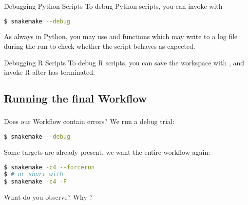 \begin{frame}[fragile]
	\frametitle{}
	\begin{exampleblock}{Debugging Python Scripts}
		To debug Python scripts, you can invoke \Snakemake{} with
		\begin{lstlisting}[language=Bash, style=Shell]
$ snakemake --debug
		\end{lstlisting}
		As always in Python, you may use  and  functions which may write to a log file during the run to check whether the script behaves as expected.
	\end{exampleblock}
	\pause
	\begin{exampleblock}{Debugging R Scripts}
		To debug R scripts, you can save the workspace with , and invoke R after \Snakemake{} has terminated. 
	\end{exampleblock}
\end{frame}

\subsection{Running the final Workflow}

\begin{frame}[fragile]
	\frametitle{}
	\begin{task}
		Does our Workflow contain errors? We run a debug trial:
		\begin{lstlisting}[language=Bash, style=Shell]
$ snakemake --debug
		\end{lstlisting}
	\end{task}
	\pause
	Some targets are already present, we want the entire workflow again:
	\begin{lstlisting}[language=Bash, style=Shell]
$ snakemake -c4 --forcerun
$ # or short with
$ snakemake -c4 -F
	\end{lstlisting}
     
	\begin{question}
		What do you observe? Why ?
	\end{question}
\end{frame}

